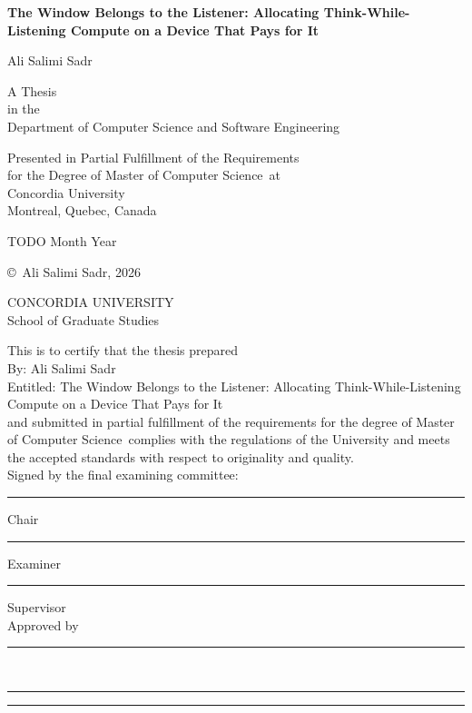 \documentclass[12pt,letterpaper,oneside]{report}
\newcommand{\thesistitle}{The Window Belongs to the Listener: Allocating
Think-While-Listening Compute on a Device That Pays for It}
\newcommand{\degreename}{Master of Computer Science}            %
\newcommand{\departmentname}{Department of Computer Science and Software
Engineering}                                                    %
\newcommand{\depositdate}{TODO Month Year}                       %
\newcommand{\deposityear}{2026}                                   %
\begin{document}
\begin{titlepage}
\centering
\vspace*{1in}
{\Large\bfseries \thesistitle\par}
\vspace{1in}
Ali Salimi Sadr\par
\vspace{1in}
A Thesis\\
in the\\
\departmentname\par
\vspace{0.5in}
Presented in Partial Fulfillment of the Requirements\\
for the Degree of \degreename\ at\\
Concordia University\\
Montreal, Quebec, Canada\par
\vspace{0.5in}
\depositdate\par
\vspace{0.5in}
\copyright\ Ali Salimi Sadr, \deposityear\par
\end{titlepage}

\thispagestyle{empty}
\begin{center}
{\large CONCORDIA UNIVERSITY}\\
School of Graduate Studies
\end{center}
\noindent This is to certify that the thesis prepared\\[1ex]
By: Ali Salimi Sadr\\
Entitled: \thesistitle\\[1ex]
and submitted in partial fulfillment of the requirements for the degree of
\degreename\ complies with the regulations of the
University and meets the accepted standards with respect to originality and
quality.\\[2ex]
Signed by the final examining committee:\\[3ex]
\rule{3in}{0.4pt}\quad Chair\\[3ex]
\rule{3in}{0.4pt}\quad Examiner\\[3ex]
\rule{3in}{0.4pt}\quad Supervisor\\[5ex]
Approved by \rule{3in}{0.4pt}\\[3ex]
\rule{1.5in}{0.4pt}\rule{0.3in}{0.4pt}
\clearpage
\end{document}
